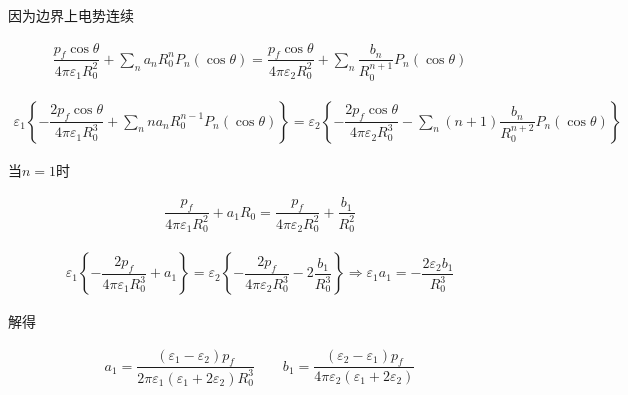 \documentclass{article}
\begin{document}
因为边界上电势连续

\begin{equation*}
  \begin{aligned}
    \dfrac{p_f\cos \theta}{4\pi \varepsilon_1 R_0^2} + \sum_n a_n R_0^n P_n \left( \cos \theta \right)
    =
    \dfrac{p_f\cos \theta}{4\pi \varepsilon_2 R_0^2} + \sum_n \dfrac{b_n}{R_0^{n+1}}  P_n \left( \cos \theta \right)
  \end{aligned}
\end{equation*}

\begin{equation*}
  \begin{aligned}
    \varepsilon_1 \left\{ - \dfrac{2p_f\cos \theta}{4\pi \varepsilon_1 R_0^3} + \sum_n n a_n R_0^{n-1} P_n \left( \cos \theta \right) \right\}
    =
    \varepsilon_2 \left\{ - \dfrac{2p_f\cos \theta}{4\pi \varepsilon_2 R_0^3} - \sum_n \left( n + 1 \right) \dfrac{b_n}{R_0^{n+2}}  P_n \left( \cos \theta \right) \right\}
  \end{aligned}
\end{equation*}


当$n=1$时

\begin{equation*}
  \begin{aligned}
    \dfrac{p_f}{4\pi \varepsilon_1 R_0^2} + a_1 R_0 
    =
    \dfrac{p_f}{4\pi \varepsilon_2 R_0^2} + \dfrac{b_1}{R_0^2} 
  \end{aligned}
\end{equation*}

\begin{equation*}
  \begin{aligned}
    \varepsilon_1 \left\{- \dfrac{2p_f}{4\pi \varepsilon_1 R_0^3} + a_1 \right\}
    =
    \varepsilon_2 \left\{ - \dfrac{2p_f}{4\pi \varepsilon_2 R_0^3} - 2 \dfrac{b_1}{R_0^3} \right\}
    \Rightarrow
    \varepsilon_1 a_1
    =
    - \dfrac{2 \varepsilon_2 b_1}{R_0^3}
  \end{aligned}
\end{equation*}

解得

\begin{equation*}
  \begin{aligned}
    a_1 = \dfrac{\left( \varepsilon_1 - \varepsilon_2 \right) p_f}{2\pi \varepsilon_1 \left( \varepsilon_1 + 2 \varepsilon_2 \right) R_0^3} 
    \quad\quad
    b_1 = \dfrac{\left( \varepsilon_2 - \varepsilon_1 \right) p_f}{4\pi \varepsilon_2 \left( \varepsilon_1 + 2\varepsilon_2 \right)} 
  \end{aligned}
\end{equation*}
\end{document}
